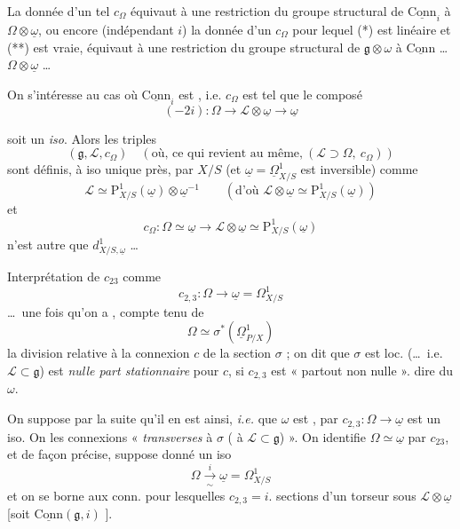 \documentclass[11pt,a4paper]{article}
\begin{document}
La donnée d'un tel $c_{\Omega}$ équivaut à une restriction du groupe structural de $\underline{\mathrm{Conn}}_i$ à $\Omega\otimes\underline{\omega}$, ou encore (indépendant   $i$) la donnée d'un $c_{\Omega}$ pour lequel (*) est linéaire et (**) est vraie, équivaut à une restriction du groupe structural de $\mathfrak{g}\otimes\omega$ à $\underline{\mathrm{Conn}}$ \ldots\ $\Omega\otimes\underline{\omega}$ \ldots

On s'intéresse au cas où $\underline{\mathrm{Conn}}_i$ est , i.e. $c_{\Omega}$ est tel que le composé
\[
(-2i) : \Omega \longrightarrow \mathcal{L}\otimes\underline{\omega} \to \underline{\omega}
\]
 \struck{\ill{}}

soit un \emph{iso}. Alors les triples
\[
(\mathfrak{g}, \mathcal{L}, c_{\Omega}) \quad (\text{où, ce qui revient au même,}\ (\mathcal{L}\supset\Omega,\ c_{\Omega}))
\]
sont définis, à iso unique près, par $X/S$ (et   $\underline{\omega} = \underline{\Omega}^1_{X/S}$ est inversible) comme
\[
\mathcal{L} \simeq \mathrm{P}^1_{X/S}(\underline{\omega})\otimes\underline{\omega}^{-1}
\qquad (\text{d'où } \mathcal{L}\otimes\underline{\omega} \simeq \mathrm{P}^1_{X/S}(\underline{\omega}))
\]
et
\[
c_{\Omega} : \Omega \simeq \underline{\omega} \longrightarrow \mathcal{L}\otimes\underline{\omega} \simeq \mathrm{P}^1_{X/S}(\underline{\omega})
\]
n'est autre que $d^1_{X/S,\underline{\omega}}$ \ldots

Interprétation de $c_{23}$ comme
\[
c_{2,3} : \Omega \longrightarrow \underline{\omega} = \Omega^1_{X/S}
\]
\ldots\ une fois qu'on a , compte tenu de
\[
\Omega \simeq \sigma^*(\underline{\Omega}^1_{P/X})
\]
la division relative à la connexion $c$ de la section $\sigma$ ; on dit que $\sigma$ est loc. (\ldots\ i.e.\ $\mathcal{L}\subset\mathfrak{g}$) est \emph{nulle part stationnaire} pour $c$, si $c_{2,3}$ est « partout non nulle ».   dire  du $\omega$.

On suppose par la suite qu'il en est ainsi, \emph{i.e.} que $\omega$ est ,   par $c_{2,3} : \Omega \to \underline{\omega}$ est un iso. On  les connexions « \emph{transverses} à $\sigma$ ( à $\mathcal{L}\subset\mathfrak{g}$) ». On identifie $\Omega\simeq\underline{\omega}$ par $c_{23}$, et de façon précise,  suppose donné un iso
\[
\Omega \xrightarrow[\ \sim\ ]{\ i\ } \underline{\omega} = \Omega^1_{X/S}
\]
et on se borne aux conn. pour lesquelles $c_{2,3} = i$. \struck{\ill{}}  sections d'un torseur sous $\mathcal{L}\otimes\underline{\omega}$ [soit $\underline{\mathrm{Conn}}(\mathfrak{g}, i)$ ].
\end{document}
